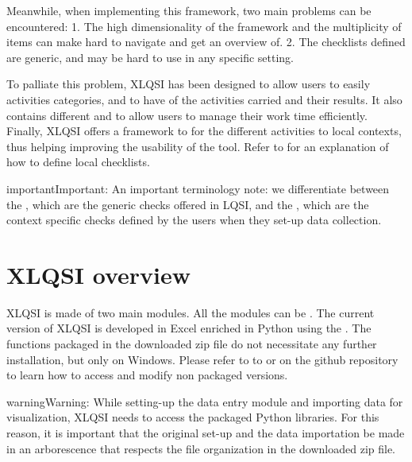 \documentclass[letterpaper,10pt,english]{sphinxmanual}
\begin{document}
Meanwhile, when implementing this framework, two main problems can be encountered:
1. The high dimensionality of the framework and the multiplicity of items can make hard to navigate and get an overview of.
2. The checklists defined are generic, and may be hard to use in any specific setting.

To palliate this problem, XLQSI has been designed to allow users to easily  activities categories, and to have  of the activities carried and their results. It also contains different  and  to allow users to manage their work time efficiently. Finally, XLQSI offers a framework to  for the different activities to local contexts, thus helping improving the usability of the tool. Refer to  for an explanation of how to define local checklists.

\begin{sphinxadmonition}{important}{Important:}
An important terminology note: we differentiate between the , which are the generic checks offered in LQSI, and the , which are the context specific checks defined by the users when they set-up data collection.
\end{sphinxadmonition}


\section{XLQSI overview}
\label{\detokenize{intro:xlqsi-overview}}
XLQSI is made of two main modules. All the modules can be . The current version of XLQSI is developed in Excel enriched in Python using the . The functions packaged in the downloaded zip file do not necessitate any further installation, but only on Windows. Please refer to to {\hyperref[\detokenize{technical::doc}]{}} or on the github repository to learn how to access and modify non packaged versions.

\begin{sphinxadmonition}{warning}{Warning:}
While setting-up the data entry module and importing data for visualization, XLQSI needs to access the packaged Python libraries. For this reason, it is important that the original set-up and the data importation be made in an arborescence that respects the file organization in the downloaded zip file.
\end{sphinxadmonition}
\end{document}
